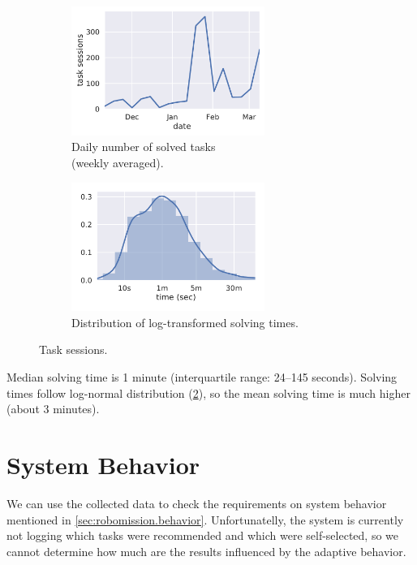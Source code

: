 \begin{figure}[htb]
\centering
\begin{subfigure}{.49\textwidth}
\centering
\includegraphics[height=42mm]{img/daily-task-sessions}
\caption{Daily number of solved tasks\\(weekly averaged).}
\label{fig:solved-count}
\end{subfigure}
\begin{subfigure}{.49\textwidth}
\centering
\includegraphics[height=42mm]{img/task-sessions-time-log}
\caption{Distribution of log-transformed solving times.}
\label{fig:solving-times-all}
\end{subfigure}
\caption{Task sessions.}
\label{fig:daily-task-sessions}
\end{figure}

Median solving time is 1 minute (interquartile range: 24--145 seconds).
Solving times follow log-normal distribution (\cref{fig:solving-times-all}),
so the mean solving time is much higher
(about 3 minutes). %


\section{System Behavior}

We can use the collected data to check the requirements on system behavior mentioned in
\cref{sec:robomission.behavior}. Unfortunatelly, the system is currently not logging
which tasks were recommended and which were self-selected, so we cannot determine
how much are the results influenced by the adaptive behavior. %

